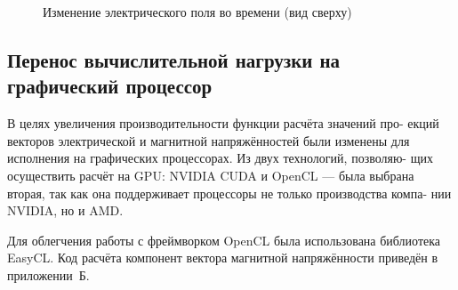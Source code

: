 \begin{figure}[p]
\begin{subfigure}[b]{0.3\textwidth}
        \label{fieldFig:6th}
    \end{subfigure}

    \caption{Изменение электрического поля во времени (вид сверху)}\label{fig:animals}
\end{figure}

\subsection{Перенос вычислительной нагрузки на графический процессор}

В целях увеличения производительности функции расчёта значений про-
екций векторов электрической и магнитной напряжённостей были изменены
для исполнения на графических процессорах. Из двух технологий, позволяю-
щих осуществить расчёт на GPU: NVIDIA CUDA и OpenCL --- была выбрана
вторая, так как она поддерживает процессоры не только производства компа-
нии NVIDIA, но и AMD.

Для облегчения работы с фреймворком OpenCL была использована библиотека EasyCL. Код расчёта компонент вектора магнитной напряжённости
приведён в приложении~Б.

